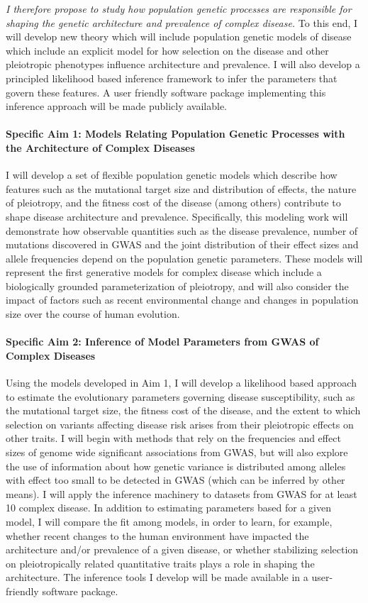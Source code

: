 \documentclass[11pt]{article}
\begin{document}
\emph{I therefore propose to study how population genetic processes are responsible for shaping the genetic architecture and prevalence of complex disease.} To this end, I will develop new theory which will include population genetic models of disease which include an explicit model for how selection on the disease and other pleiotropic phenotypes influence architecture and prevalence. I will also develop a principled likelihood based inference framework to infer the parameters that govern these features. A user friendly software package implementing this inference approach will be made publicly available.


\paragraph{Specific Aim 1:  Models Relating Population Genetic Processes with the Architecture of Complex Diseases}
I will develop a set of flexible population genetic models which describe how features such as the mutational target size and distribution of effects, the nature of pleiotropy, and the fitness cost of the disease (among others) contribute to shape disease architecture and prevalence. Specifically, this modeling work will demonstrate how observable quantities such as the disease prevalence, number of mutations discovered in GWAS and the joint distribution of their effect sizes and allele frequencies depend on the population genetic parameters. These models will represent the first generative models for complex disease which include a biologically grounded parameterization of pleiotropy, and will also consider the impact of factors such as recent environmental change and changes in population size over the course of human evolution. 


\paragraph{Specific Aim 2: Inference of Model Parameters from GWAS of Complex Diseases} Using the models developed in Aim 1, I will develop a likelihood based approach to estimate the evolutionary parameters governing disease susceptibility, such as the mutational target size, the fitness cost of the disease, and the extent to which selection on variants affecting disease risk arises from their pleiotropic effects on other traits. I will begin with methods that rely on the frequencies and effect sizes of genome wide significant associations from GWAS, but will also explore the use of information about how genetic variance is distributed among alleles with effect too small to be detected in GWAS (which can be inferred by other means). I will apply the inference machinery to datasets from GWAS for at least 10 complex disease. In addition to estimating parameters based for a given model, I will compare the fit among models, in order to learn, for example, whether recent changes to the human environment have impacted the architecture and/or prevalence of a given disease, or whether stabilizing selection on pleiotropically related quantitative traits plays a role in shaping the architecture. The inference tools I develop will be made available in a user-friendly software package.
\end{document}
